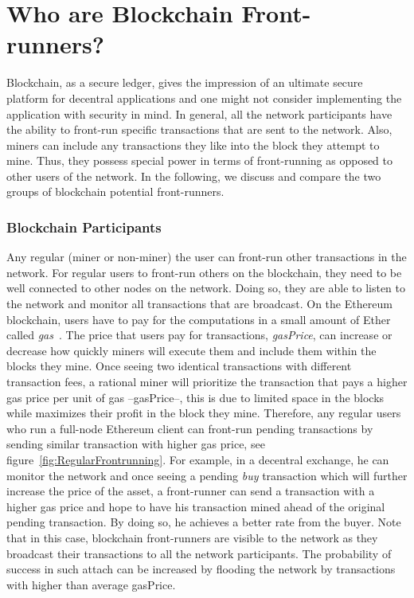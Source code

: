 
\section{Who are Blockchain Front-runners?} %
\label{sec:who can front-run?}

Blockchain, as a secure ledger, gives the impression of an ultimate secure platform for decentral applications and one might not consider implementing the application with security in mind. In general, all the network participants have the ability to front-run specific transactions that are sent to the network. Also, miners can include any transactions they like into the block they attempt to mine. Thus, they possess special power in terms of front-running as opposed to other users of the network. In the following, we discuss and compare the two groups of blockchain potential front-runners.

\subsubsection{Blockchain Participants}
Any regular (miner or non-miner) the user can front-run other transactions in the network. For regular users to front-run others on the blockchain, they need to be well connected to other nodes on the network. Doing so, they are able to listen to the network and monitor all transactions that are broadcast. On the Ethereum blockchain, users have to pay for the computations in a small amount of Ether called \textit{gas}~\cite{AccountT67:online}. The price that users pay for transactions, \textit{gasPrice}, can increase or decrease how quickly miners will execute them and include them within the blocks they mine. Once seeing two identical transactions with different transaction fees, a rational miner will prioritize the transaction that pays a higher gas price per unit of gas --gasPrice--, this is due to limited space in the blocks while maximizes their profit in the block they mine. Therefore, any regular users who run a full-node Ethereum client can front-run pending transactions by sending similar transaction with higher gas price, see figure~\ref{fig:RegularFrontrunning}. For example, in a decentral exchange, he can monitor the network and once seeing a pending \textit{buy} transaction which will further increase the price of the asset, a front-runner can send a transaction with a higher gas price and hope to have his transaction mined ahead of the original pending transaction. By doing so, he achieves a better rate from the buyer. Note that in this case, blockchain front-runners are visible to the network as they broadcast their transactions to all the network participants. The probability of success in such attach can be increased by flooding the network by transactions with higher than average gasPrice.

